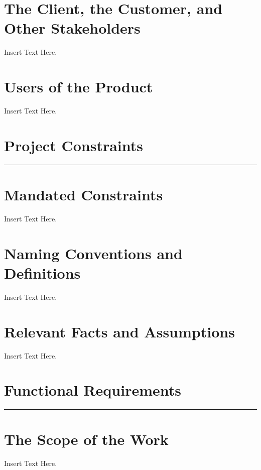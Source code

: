 \documentclass [12pt]{article}
\begin{document}
\section{The Client, the Customer, and Other Stakeholders}
 Insert Text Here.

\section{Users of the Product} 
Insert Text Here.\\


\section*{\Large Project Constraints \vspace*{-6mm}}\rule{6.5in}{.1em} 

\section{Mandated Constraints}
	Insert Text Here. 

\section{Naming Conventions and Definitions}
	Insert Text Here.
	
\section{Relevant Facts and Assumptions} 
	Insert Text Here.


\section *{\Large Functional Requirements\vspace*{-6mm}}\rule{6.5in}{.1em} 

\section{The Scope of the Work}
Insert Text Here.
\end{document}
